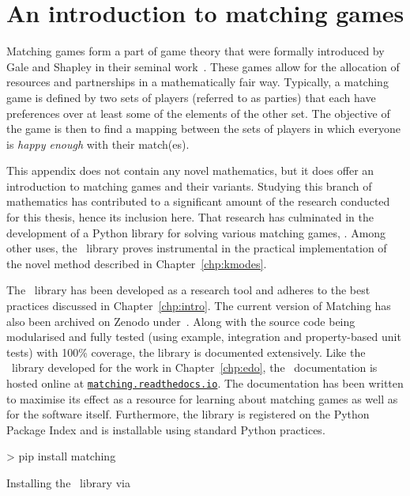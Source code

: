 \chapter{An introduction to matching games}
\label{app:matching}

\graphicspath{{appendix/matching/paper/img/}}

Matching games form a part of game theory that were formally introduced by Gale
and Shapley in their seminal work~\cite{Gale1962}. These games allow for the
allocation of resources and partnerships in a mathematically fair way.
Typically, a matching game is defined by two sets of players (referred to as
parties) that each have preferences over at least some of the elements of the
other set.  The objective of the game is then to find a mapping between the sets
of players in which everyone is \emph{happy enough} with their match(es).

This appendix does not contain any novel mathematics, but it does offer an
introduction to matching games and their variants. Studying this branch of
mathematics has contributed to a significant amount of the research conducted
for this thesis, hence its inclusion here. That research has culminated in the
development of a Python library for solving various matching games, \matching.
Among other uses, the \matching\ library proves instrumental in the practical
implementation of the novel method described in Chapter~\ref{chp:kmodes}.

The \matching\ library has been developed as a research tool and adheres to the
best practices discussed in Chapter~\ref{chp:intro}. The current version of
Matching has also been archived on Zenodo under~.
Along with the source code being modularised and fully tested (using example,
integration and property-based unit tests) with 100\% coverage, the library is
documented extensively. Like the \edo\ library developed for the work in
Chapter~\ref{chp:edo}, the \matching\ documentation is hosted online at
\href{https://matching.readthedocs.io}{\nolinkurl{matching.readthedocs.io}}.
The documentation has been written to maximise its effect as a resource for
learning about matching games as well as for the software itself. Furthermore,
the library is registered on the Python Package Index and is installable using
standard Python practices.

\begin{listing}[htbp]
\begin{usagesh}
> pip install matching
\end{usagesh}
\caption{Installing the \matching\ library via \pip}
\end{listing}

